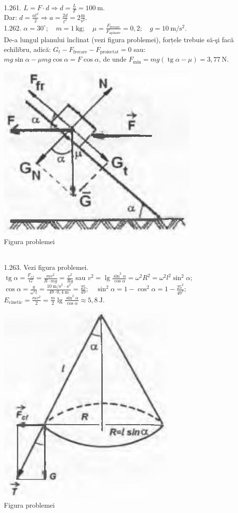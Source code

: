 1.261. $L=F \cdot d \Rightarrow d=\frac{L}{F}=100 \mathrm{~m}$.\\ Dar: $d=\frac{a t^{2}}{2} \Rightarrow a=\frac{2 d}{t^{2}}=2 \frac{\mathrm{m}}{\mathrm{s}^{2}}$.\\

1.262. $\alpha=30^{\circ}; \quad m=1 \mathrm{~kg}; \quad \mu=\frac{F_{\text {frecare}}}{F_{\text {apăsare}}}=0,2; \quad g=10 \mathrm{~m} / \mathrm{s}^{2}$.\\ De-a lungul planului înclinat (vezi figura problemei), forțele trebuie să-şi facă echilibru, adică: $G_{t}-F_{\text {frecare}}-F_{\text {proiectat}}=0$ sau:\\ $m g \sin \alpha-\mu m g \cos \alpha=F \cos \alpha$, de unde $F_{\text {min}}=m g(\operatorname{tg} \alpha-\mu)=3,77 \mathrm{~N}$.\\ \begin{center} \includegraphics[width=0.4\linewidth]{images/2025_07_01_5b3ff9fa0d508c8e9f17g-254(1)}\\ Figura problemei \end{center}\\

1.263. Vezi figura problemei.\\ $\operatorname{tg} \alpha=\frac{F_{c f}}{G}=\frac{m v^{2}}{R \cdot m g}=\frac{v^{2}}{R g}$ sau $v^{2}=\lg \frac{\sin ^{2} \alpha}{\cos \alpha}=\omega^{2} R^{2}=\omega^{2} l^{2} \sin ^{2} \alpha;$\\ $\cos \alpha=\frac{g}{\omega^{2} l}=\frac{10 \mathrm{~m} / \mathrm{s}^{2} \cdot \mathrm{~s}^{2}}{49 \cdot 0,4 \mathrm{~m}}=\frac{25}{49}; \quad \sin ^{2} \alpha=1-\cos ^{2} \alpha=1-\frac{25^{2}}{49^{2}};$\\ $E_{\text {cinetic}}=\frac{m v^{2}}{2}=\frac{m}{2} \lg \frac{\sin ^{2} \alpha}{\cos \alpha} \approx 5,8 \mathrm{~J}$.\\ \begin{center} \includegraphics[width=0.4\linewidth]{images/2025_07_01_5b3ff9fa0d508c8e9f17g-254}\\ Figura problemei \end{center}\\

